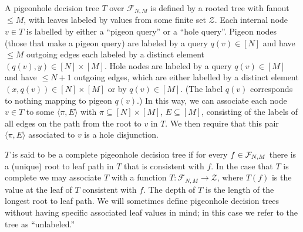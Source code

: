 \begin{definition}
A pigeonhole decision tree $T$ over $\mathcal{F}_{N,M}$ is defined by a rooted tree with fanout $\leq M$, with leaves labeled by values from some finite set $\mathcal{Z}$. Each internal node $v \in T$ is labelled by either a ``pigeon query'' or a ``hole query''.  Pigeon nodes (those that make a pigeon query) are labeled by a query $q(v) \in [N]$ and have $\leq M$ outgoing edges each labeled by a distinct element $(q(v), y) \in [N] \times [M]$. 
Hole nodes are labeled by a query $q(v) \in [M]$ and have $\leq N+1$ outgoing edges, which are either labelled by a  distinct element $(x,q(v)) \in [N] \times [M]$ or by $q(v) \in [M]$. (The label $q(v)$ corresponds to nothing mapping to pigeon $q(v)$.)  
In this way, we can associate each node $v \in T$ to some $\langle \pi, E\rangle$ with $\pi \subseteq [N] \times [M]$, $E \subseteq [M]$, consisting of the labels of all edges on the path from the root to $v$ in $T$. We then require that this pair $\langle \pi, E\rangle$ associated to $v$ is a hole disjunction.

$T$ is said to be a complete pigeonhole decision tree if for every $f \in {\cal F}_{N,M}$ there is a (unique) root to leaf path in $T$ that is consistent with $f$. In the case that $T$ is complete we may associate $T$ with a function $T: \mathcal{F}_{N,M} \to \mathcal{Z}$, where $T(f)$ is the value at the leaf of $T$ consistent with $f$.
The depth of $T$ is the length of the longest root to leaf path. We will sometimes define pigeonhole decision trees without having specific associated leaf values in mind; in this case we refer to the tree as ``unlabeled.''




\end{definition}
